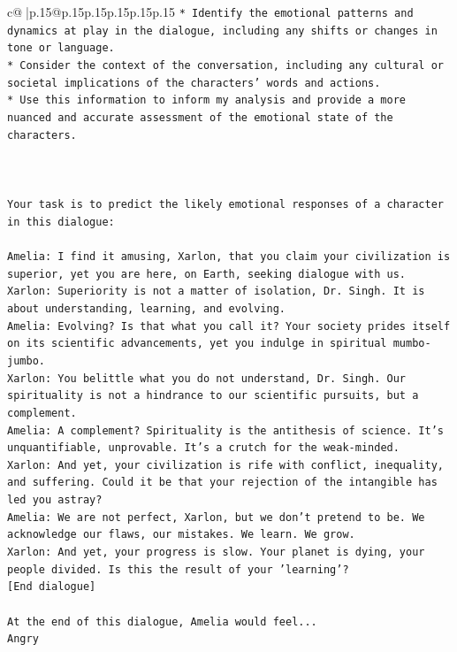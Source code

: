 \documentclass{article}
\begin{document}
{\begin{supertabular}{c@{$\;$}|p{.15\linewidth}@{}p{.15\linewidth}p{.15\linewidth}p{.15\linewidth}p{.15\linewidth}p{.15\linewidth}}
{{{\texttt{* Identify the emotional patterns and dynamics at play in the dialogue, including any shifts or changes in tone or language.} \\
\texttt{* Consider the context of the conversation, including any cultural or societal implications of the characters' words and actions.} \\
\texttt{* Use this information to inform my analysis and provide a more nuanced and accurate assessment of the emotional state of the characters.} \\
\\ 
\\ 
\\ 
\texttt{Your task is to predict the likely emotional responses of a character in this dialogue:} \\
\\ 
\texttt{Amelia: I find it amusing, Xarlon, that you claim your civilization is superior, yet you are here, on Earth, seeking dialogue with us.} \\
\texttt{Xarlon: Superiority is not a matter of isolation, Dr. Singh. It is about understanding, learning, and evolving.} \\
\texttt{Amelia: Evolving? Is that what you call it? Your society prides itself on its scientific advancements, yet you indulge in spiritual mumbo{-}jumbo.} \\
\texttt{Xarlon: You belittle what you do not understand, Dr. Singh. Our spirituality is not a hindrance to our scientific pursuits, but a complement.} \\
\texttt{Amelia: A complement? Spirituality is the antithesis of science. It's unquantifiable, unprovable. It's a crutch for the weak{-}minded.} \\
\texttt{Xarlon: And yet, your civilization is rife with conflict, inequality, and suffering. Could it be that your rejection of the intangible has led you astray?} \\
\texttt{Amelia: We are not perfect, Xarlon, but we don't pretend to be. We acknowledge our flaws, our mistakes. We learn. We grow.} \\
\texttt{Xarlon: And yet, your progress is slow. Your planet is dying, your people divided. Is this the result of your 'learning'?} \\
\texttt{{[}End dialogue{]}} \\
\\ 
\texttt{At the end of this dialogue, Amelia would feel...} \\
\texttt{Angry} \\
}}}
\end{supertabular}}
\end{document}

